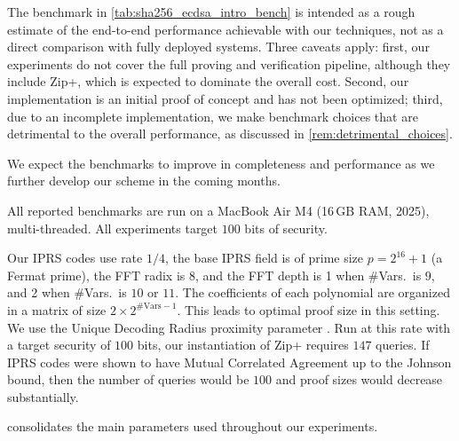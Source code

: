\begin{remark}
  The benchmark in \cref{tab:sha256_ecdsa_intro_bench} is intended as a rough estimate of the end-to-end performance achievable with our techniques, not as a direct comparison with fully deployed systems. Three caveats apply: first, our experiments do not cover the  full proving and verification pipeline, although they include Zip+, which is expected to dominate the overall cost. Second, our implementation is an initial proof of concept and has not been optimized; third, due to an incomplete implementation, we make benchmark choices that are detrimental to the overall performance, as discussed in \cref{rem:detrimental_choices}. 
  
  We expect the benchmarks to improve in completeness and performance as we further develop our scheme in the coming months.
\end{remark}



All reported benchmarks are run on a MacBook Air M4 (16\,GB RAM, 2025), multi-threaded. All experiments target $100$ bits of security.


Our IPRS codes use rate $1/4$, the base IPRS field is of prime size $p=2^{16}+1$  (a Fermat prime),  the FFT radix is $8$, and the FFT depth is 1 when \#Vars.\ is $9$, and 2 when \#Vars.\ is $10$ or $11$. The coefficients of each polynomial are organized in a matrix of size $2 \times 2^{\text{\#Vars}-1}$. This leads to optimal proof size in this setting. We use the Unique Decoding Radius proximity parameter %
. Run at this rate with a target security of $100$ bits, our instantiation of Zip+ requires $147$ queries. If IPRS codes were shown to have  Mutual Correlated Agreement up to the Johnson bound,%
then the number of queries would be $100$ and proof sizes would decrease substantially.

 consolidates the main parameters used throughout our experiments.

